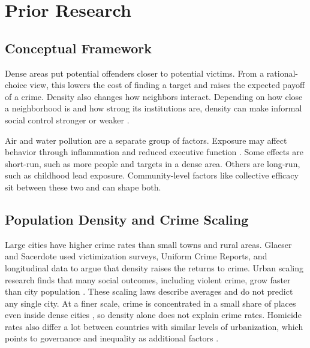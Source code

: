 \documentclass[12pt,letterpaper]{report}
\begin{document}
\chapter{Prior Research}

\section{Conceptual Framework}
Dense areas put potential offenders closer to potential victims. From a rational-choice
view, this lowers the cost of finding a target and raises the expected payoff of a crime.
Density also changes how neighbors interact. Depending on how close a neighborhood is and how
strong its institutions are, density can make informal social control stronger or weaker
\cite{glaeser1999,sampson1997}.

Air and water pollution are a separate group of factors. Exposure may affect behavior
through inflammation and reduced executive function \cite{bondy2020,reyes2007}. Some effects
are short-run, such as more people and targets in a dense area. Others are long-run, such as
childhood lead exposure. Community-level factors like collective efficacy sit between these
two and can shape both.

\section{Population Density and Crime Scaling}
Large cities have higher crime rates than small towns and rural areas. Glaeser and Sacerdote
\cite{glaeser1999} used victimization surveys, Uniform Crime Reports, and longitudinal data
to argue that density raises the returns to crime. Urban scaling research finds that many
social outcomes, including violent crime, grow faster than city population
\cite{bettencourt2007,bettencourt2013,oliveira2017}. These scaling laws describe averages
and do not predict any single city. At a finer scale, crime is concentrated in a small
share of places even inside dense cities \cite{weisburd2015}, so density alone does not
explain crime rates. Homicide rates also differ a lot between countries with similar levels
of urbanization, which points to governance and inequality as additional factors
\cite{unodc2023}.
\end{document}
